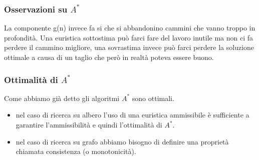 \documentclass{article}
\begin{document}
\subsubsection{Osservazioni su $A^*$}
La componente g(n) invece fa si che si abbandonino cammini che vanno troppo in profondità. \newline
Una euristica sottostima può farci fare del lavoro inutile ma non ci fa perdere il cammino migliore, una sovrastima invece può farci perdere la soluzione ottimale a causa di un taglio che però in realtà poteva essere buono.

\subsubsection{Ottimalità di $A^*$}
Come abbiamo già detto gli algoritmi $A^*$ sono ottimali.
\begin{itemize}
    \item nel caso di ricerca su albero l'uso di una euristica ammissibile è sufficiente a garantire l'ammissibilità e quindi l'ottimalità di $A^*$.
    \item nel caso di ricerca su grafo abbiamo bisogno di definire una proprietà chiamata consistenza (o monotonicità).
\end{itemize}
\end{document}
